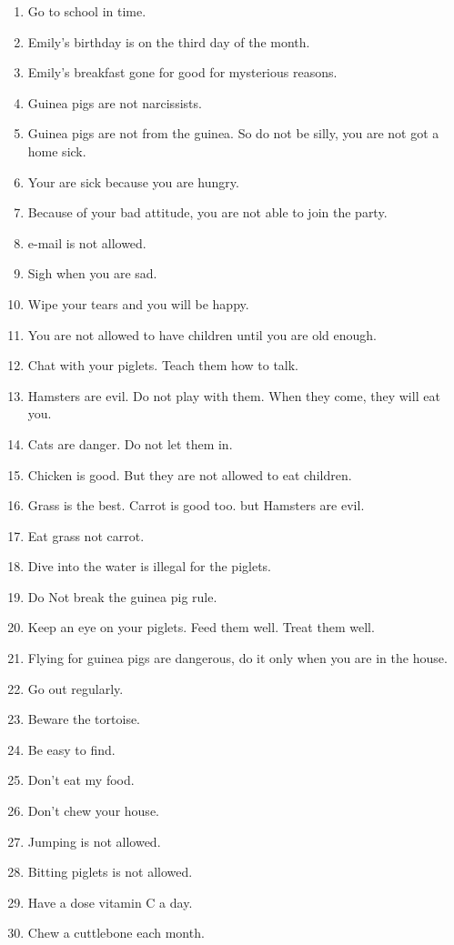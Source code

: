\documentclass{article}
\begin{document}
\begin{multicols}{2}
\begin{enumerate}
\item Go to school in time. 
\item Emily's birthday is on the third day of the month.
\item Emily's breakfast gone for good for mysterious reasons.
\item Guinea pigs are not narcissists. 
\item Guinea pigs are not from the guinea. So do not be silly, you are not got a home sick.
\item Your are sick because you are hungry.
\item Because of your bad attitude, you are not able to join the party.
\item e-mail is not allowed.
\item Sigh when you are sad.
\item Wipe your tears and you will be happy.
\item You are not allowed to have children until you are old enough.
\item Chat with your piglets. Teach them how to talk.
\item Hamsters are evil. Do not play with them. When they come, they will eat you.
\item Cats are danger. Do not let them in. 
\item Chicken is good. But they are not allowed to eat children.
\item Grass is the best. Carrot is good too. but Hamsters are evil.
\item Eat grass not carrot.
\item Dive into the water is illegal for the piglets.
\item Do Not break the guinea pig rule. 
\item Keep an eye on your piglets. Feed them well. Treat them well. 
\item Flying for guinea pigs are dangerous, do it only when you are in the house. 
\item Go out regularly.
\item Beware the tortoise.
\item Be easy to find.
\item Don't eat my food.
\item Don't chew your house. 
\item Jumping is not allowed.
\item Bitting piglets is not allowed.
\item Have a dose vitamin C a day.
\item Chew a cuttlebone each month.

\end{enumerate}
\end{multicols}
\end{document}
